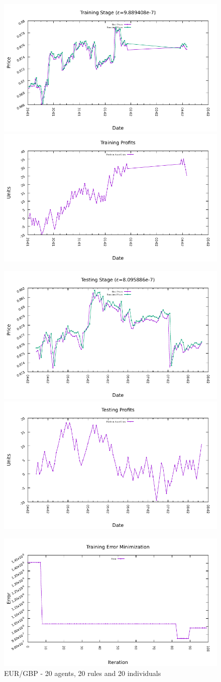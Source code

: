 \begin{figure}[htp]
  \centering

  \includegraphics[width=.45\textwidth]{img/plots/eur_gbp_h1-20agents-20rules-20ind-100gen_training_fit.pdf}\quad
  \includegraphics[width=.45\textwidth]{img/plots/eur_gbp_h1-20agents-20rules-20ind-100gen_training_profits.pdf}

  \medskip

  \includegraphics[width=.45\textwidth]{img/plots/eur_gbp_h1-20agents-20rules-20ind-100gen_testing_fit.pdf}\quad
  \includegraphics[width=.45\textwidth]{img/plots/eur_gbp_h1-20agents-20rules-20ind-100gen_testing_profits.pdf}

  \medskip

  \includegraphics[width=.45\textwidth]{img/plots/eur_gbp_h1-20agents-20rules-20ind-100gen_error_minimization.pdf}

  \caption{EUR/GBP - 20 agents, 20 rules and 20 individuals}
  \label{figure:eur-gbp-20agents-20rules-20individuals}
\end{figure}




